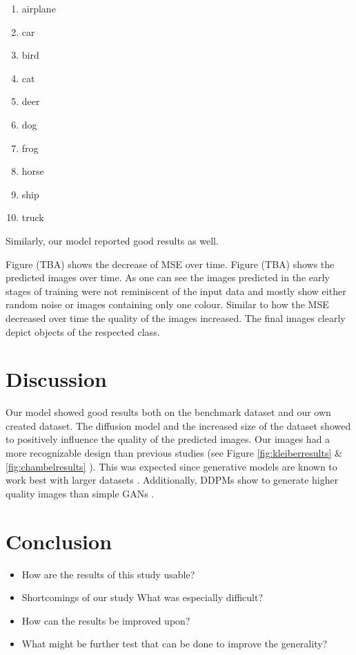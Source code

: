 \documentclass[12pt]{article}
\theoremstyle{plain}
\theoremstyle{definition}
\theoremstyle{remark}
\begin{document}
\begin{multicols}{3}
	\begin{enumerate}[itemsep=2pt,parsep=2pt]
		\item airplane
		\item car
		\item bird
		\item cat
		\item deer
		\item dog
		\item frog 
		\item horse
		\item ship
		\item truck
	\end{enumerate}
\end{multicols}

Similarly, our model reported good results as well. 

Figure (TBA) shows the decrease of \ac{MSE} over time. 
Figure (TBA) shows the predicted images over time. As one can see the images predicted in the early stages of training were not reminiscent of the input data and mostly show either random noise or images containing only one colour. Similar to how the \ac{MSE} decreased over time the quality of the images increased. The final images clearly depict objects of the respected class. 

\section{Discussion}
\label{sec:discussion}
Our model showed good results both on the benchmark dataset and our own created dataset. The diffusion model and the increased size of the dataset showed to positively influence the quality of the predicted images. Our images had a more recognizable design than previous studies (see Figure \ref{fig:kleiberresults} \& \ref{fig:chambelresults} ). This was expected since generative models are known to work best with larger datasets \citep{Yang2023}. Additionally, \ac{DDPM}s show to generate higher quality images than simple \ac{GAN}s \citep{Guarnera2023}.

\section{Conclusion}
\label{sec:conclusion}

\begin{itemize}
	\item How are the results of this study usable? 
	\item Shortcomings of our study What was especially difficult? 	 
	\item How can the results be improved upon? 
	\item What might be further test that can be done to improve the generality? 
\end{itemize}

%
%
\printbibliography[heading=bibintoc]
\end{document}
